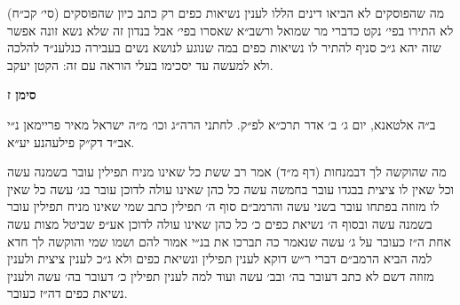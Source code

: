 \documentclass[12pt, openany]{book}
\newcommand{\chapname}{}
\newcommand{\newchap}[1]{
	\addcontentsline{toc}{chapter}{#1}
	\renewcommand{\chapname}{#1}
		\begin{center}
			\textbf{%
\fontsize{16pt}{16pt}\selectfont
				#1}
		\end{center}
}
\begin{document}
\begin{multicols}{2}
(סי׳ קכ״ח) מה שהפוסקים לא הביאו דינים הללו לענין נשיאות כפים רק כתב כיון שהפוסקים לא התירו בפי׳ נקט כדברי מר שמואל ורשב״א שאסרו בפי׳ אבל בנדון זה שלא נשא זונה אפשר שזה יהא ג״כ סניף להתיר לו נשיאות כפים במה שנוגע לנושא נשים בעבירה כנלענ״ד להלכה ולא למעשה עד יסכימו בעלי הוראה עם זה: הקטן יעקב.\\\vspace{0pt}

\end{multicols}\newpage

\newchap{סימן ז}
\begin{multicols}{2}
ב״ה אלטאנא, יום ג׳ ב׳ אדר תרכ״א לפ״ק. לחתני הרה״ג וכו׳ מ״ה ישראל מאיר פריימאן נ״י אב״ד דק״ק פילעהנע יע״א.\\\vspace{0pt}

מה שהוקשה לך דבמנחות (דף מ״ד) אמר רב ששת כל שאינו מניח תפילין עובר בשמנה עשה וכל שאין לו ציצית בבגדו עובר בחמשה עשה כל כהן שאינו עולה לדוכן עובר בג׳ עשה כל שאין לו מזוזה בפתחו עובר בשני עשה והרמב״ם סוף ה׳ תפילין כתב שמי שאינו מניח תפילין עובר בשמנה עשה ובסוף ה׳ נשיאת כפים כ׳ כל כהן שאינו עולה לדוכן אע״פ שביטל מצות עשה אחת ה״ז כעובר על ג׳ עשה שנאמר כה תברכו את בנ״י אמור להם ושמו שמי והוקשה לך חדא למה הביא הרמב״ם דברי ר״ש דוקא לענין תפילין ונשיאת כפים ולא ג״כ לענין ציצית ולענין מזוזה דשם לא כתב דעובר בה׳ ובב׳ עשה ועוד למה לענין תפילין כ׳ דעובר בה׳ עשה ולענין נשיאת כפים דה״ז כעובר.\\\vspace{0pt}


\end{multicols}
\end{document}
